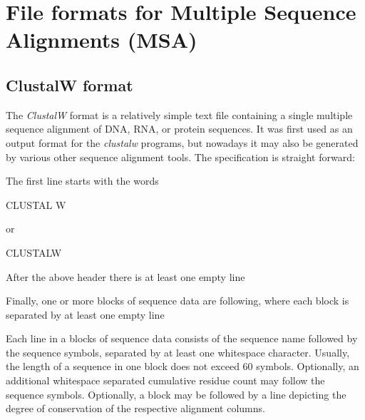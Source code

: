 \hypertarget{file_formats_msa-formats}{}\section{File formats for Multiple Sequence Alignments (\+M\+S\+A)}\label{file_formats_msa-formats}
\hypertarget{file_formats_msa-formats-clustal}{}\subsection{Clustal\+W format}\label{file_formats_msa-formats-clustal}
The {\itshape ClustalW} format is a relatively simple text file containing a single multiple sequence alignment of D\+NA, R\+NA, or protein sequences. It was first used as an output format for the {\itshape clustalw} programs, but nowadays it may also be generated by various other sequence alignment tools. The specification is straight forward\+:


\begin{DoxyItemize}
\item The first line starts with the words\begin{DoxyVerb}CLUSTAL W \end{DoxyVerb}
 or \begin{DoxyVerb}CLUSTALW \end{DoxyVerb}

\item After the above header there is at least one empty line
\item Finally, one or more blocks of sequence data are following, where each block is separated by at least one empty line
\end{DoxyItemize}Each line in a blocks of sequence data consists of the sequence name followed by the sequence symbols, separated by at least one whitespace character. Usually, the length of a sequence in one block does not exceed 60 symbols. Optionally, an additional whitespace separated cumulative residue count may follow the sequence symbols. Optionally, a block may be followed by a line depicting the degree of conservation of the respective alignment columns.

